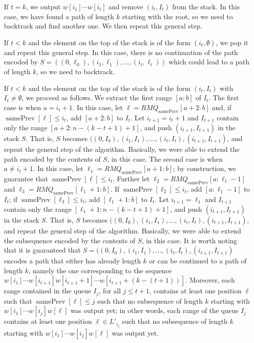 \documentclass[10pt,a4paper]{amsart}
\makeatletter
\DeclareMathOperator{\prevArray}{samePrev}
\theoremstyle{plain}
\theoremstyle{definition}
\renewenvironment{proof}[1][\proofname]{\par
  \pushQED{}%
  \normalfont \topsep6\p@\@plus6\p@\relax
  \trivlist
  \item[\hskip\labelsep\itshape #1\@addpunct{.}]\ignorespaces
}{%
  \popQED\endtrivlist\@endpefalse
}
\makeatother
\begin{document}
\begin{proof}
If $t=k$, we output $w[i_1]\cdots w[i_t]$ and remove $(i_t, I_t)$ from the stack. In this case, we have found a path of length $k$ starting with the root, so we need to backtrack and find another one. We then repeat this general step.  

If $t<k$ and the element on the top of the stack is of the form $(i_t,\emptyset)$, we pop it and repeat this general step. In this case, there is no continuation of the path encoded by $S=((0,\ell_0), (i_1, \ell_1), \ldots, (i_t, \ell_t))$ which could lead to a path of length $k$, so we need to backtrack.

If $t<k$ and the element on the top of the stack is of the form $(i_t,I_t)$ with $I_t\neq \emptyset$, we proceed as follows. We extract the first range $[a:b]$ of $I_t$. The first case is when $a=i_t+1$. In this case, let $\ell=RMQ_{\prevArray}[a+2:b]$ and, if $\prevArray[\ell]\leq i_t$, add $[a+2:b]$ to $I_t$. Let $i_{t+1}=i_t+1$ and $I_{t+1}$ contain only the range $[a+2:n-(k-t+1)+1]$, and push $(i_{t+1},I_{t+1})$ in the stack $S$. That is, $S$ becomes $((0,I_0), (i_1, I_1), \ldots, (i_t,I_t), (i_{t+1}, I_{t+1})$, and repeat the general step of the algorithm. Basically, we were able to extend the path encoded by the contents of $S$, in this case. The second case is when $a\neq i_t+1$. In this case, let $\ell_1=RMQ_{\prevArray}[a+1:b]$; by construction, we guarantee that $\prevArray[\ell]\leq i_t$. Further let $\ell_2=RMQ_{\prevArray}[a:\ell_1-1]$ and $\ell_3=RMQ_{\prevArray}[\ell_1+1:b]$. If $\prevArray[\ell_2]\leq i_t$, add $[a:\ell_1-1]$ to $I_t$; if $\prevArray[\ell_3]\leq i_t$, add $[\ell_1+1:b]$ to $I_t$.  Let $i_{t+1}=\ell_1$ and $I_{t+1}$ contain only the range $[\ell_1+1:n-(k-t+1)+1]$, and push $(i_{t+1},I_{t+1})$ in the stack $S$. That is, $S$ becomes $((0,I_0), (i_1, I_1), \ldots, (i_t,I_t), (i_{t+1}, I_{t+1})$, and repeat the general step of the algorithm. Basically, we were able to extend the subsequence encoded by the contents of $S$, in this case. It is worth noting that it is guaranteed that $S=((0,I_0), (i_1, I_1), \ldots, (i_t,I_t), (i_{t+1}, I_{t+1})$ encodes a path that either has already length $k$ or can be continued to a path of length $k$, namely the one corresponding to the sequence $w[i_1] \cdots w[i_{t+1}] w[i_{t+1}+1]\cdots w[i_{t+1}+(k-(t+1))]$. Moreover, each range contained in the queue $I_j$, for all $j\leq t+1$, contains at least one position $\ell$ such that $\prevArray [\ell]\leq j$ such that no subsequence of length $k$ starting with $w[i_1] \cdots w[i_{j}]w[\ell]$ was output yet; in other words, each range of the queue $I_j$ contains at least one position $\ell\in L'_{i_j}$ such that no subsequence of length $k$ starting with $w[i_1] \cdots w[i_{j}]w[\ell]$ was output yet. 


\end{proof}
\end{document}

